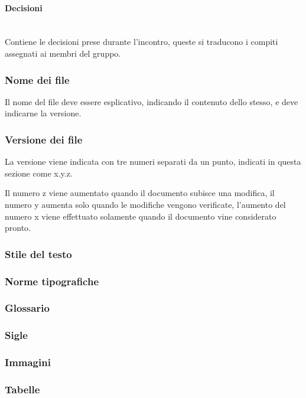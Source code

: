 \documentclass{article}
\begin{document}
\paragraph{Decisioni}~\\
Contiene le decisioni prese durante l'incontro, queste si traducono i compiti assegnati ai membri del gruppo.

\subsubsection{Nome dei file}
Il nome del file deve essere esplicativo, indicando il contenuto dello stesso, e deve indicarne la versione.

\subsubsection{Versione dei file}

La versione viene indicata con tre numeri separati da un punto, indicati in questa sezione come x.y.z.

Il numero z viene aumentato quando il documento subisce una modifica, il numero y aumenta solo quando le modifiche vengono verificate, l'aumento del numero x viene effettuato solamente quando il documento vine considerato pronto.


\subsubsection{Stile del testo}

\subsubsection{Norme tipografiche}

\subsubsection{Glossario}

\subsubsection{Sigle}

\subsubsection{Immagini}

\subsubsection{Tabelle}
\end{document}
